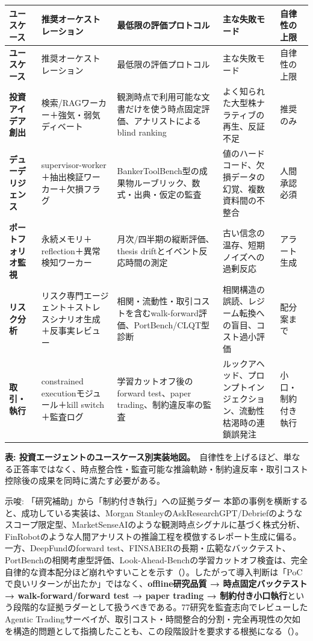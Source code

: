 \begingroup
\footnotesize
\setlength{\tabcolsep}{4pt}
\begin{longtable}{@{}>{\bfseries}p{2.5cm}p{3.0cm}p{3.1cm}p{3.5cm}p{2.3cm}@{}}
\toprule
ユースケース & 推奨オーケストレーション & 最低限の評価プロトコル & 主な失敗モード & 自律性の上限\\
\midrule
\endfirsthead
\toprule
ユースケース & 推奨オーケストレーション & 最低限の評価プロトコル & 主な失敗モード & 自律性の上限\\
\midrule
\endhead
投資アイデア創出 & 検索/RAGワーカー＋強気・弱気ディベート & 観測時点で利用可能な文書だけを使う時点固定評価、アナリストによるblind ranking & よく知られた大型株ナラティブの再生、反証不足 & 推奨のみ\\
\addlinespace
デューデリジェンス & supervisor-worker＋抽出検証ワーカー＋欠損フラグ & BankerToolBench型の成果物ルーブリック、数式・出典・仮定の監査 & 値のハードコード、欠損データの幻覚、複数資料間の不整合 & 人間承認必須\\
\addlinespace
ポートフォリオ監視 & 永続メモリ＋reflection＋異常検知ワーカー & 月次/四半期の縦断評価、thesis driftとイベント反応時間の測定 & 古い信念の温存、短期ノイズへの過剰反応 & アラート生成\\
\addlinespace
リスク分析 & リスク専門エージェント＋ストレスシナリオ生成＋反事実レビュー & 相関・流動性・取引コストを含むwalk-forward評価、PortBench/CLQT型診断 & 相関構造の誤読、レジーム転換への盲目、コスト過小評価 & 配分案まで\\
\addlinespace
取引・執行 & constrained executionモジュール＋kill switch＋監査ログ & 学習カットオフ後のforward test、paper trading、制約違反率の監査 & ルックアヘッド、プロンプトインジェクション、流動性枯渇時の連鎖誤発注 & 小口・制約付き執行\\
\bottomrule
\end{longtable}
\endgroup

\vspace{-1mm}
{\small\color{figgray}\textbf{表: 投資エージェントのユースケース別実装地図。}\
自律性を上げるほど、単なる正答率ではなく、時点整合性・監査可能な推論軌跡・制約違反率・取引コスト控除後の成果を同時に満たす必要がある。}

\begin{insight}{示唆: 「研究補助」から「制約付き執行」への証拠ラダー}
本節の事例を横断すると、成功している実装は、Morgan StanleyのAskResearchGPT/Debriefのようなスコープ限定型、MarketSenseAIのような観測時点シグナルに基づく株式分析、FinRobotのような人間アナリストの推論工程を模倣するレポート生成に偏る。一方、DeepFundのforward test、FINSABERの長期・広範なバックテスト、PortBenchの相関考慮型評価、Look-Ahead-Benchの学習カットオフ検査は、完全自律的な資本配分ほど崩れやすいことを示す（\cite{deepfund2025,x04finsaber2025,portbench2026,lookaheadbench2026}）。したがって導入判断は「PoCで良いリターンが出たか」ではなく、\textbf{offline研究品質 → 時点固定バックテスト → walk-forward/forward test → paper trading → 制約付き小口執行}という段階的な証拠ラダーとして扱うべきである。77研究を監査志向でレビューしたAgentic Tradingサーベイが、取引コスト・時間整合的分割・完全再現性の欠如を構造的問題として指摘したことも、この段階設計を要求する根拠になる（\cite{agentictrading2026}）。
\end{insight}

